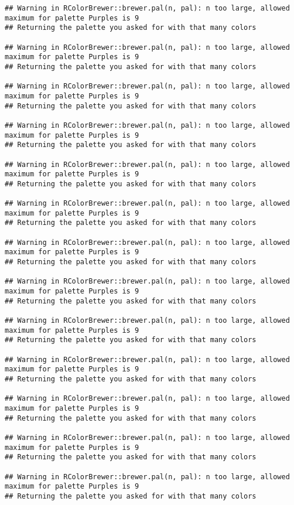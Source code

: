 \documentclass[
]{article}
\begin{document}
\begin{verbatim}
## Warning in RColorBrewer::brewer.pal(n, pal): n too large, allowed maximum for palette Purples is 9
## Returning the palette you asked for with that many colors

## Warning in RColorBrewer::brewer.pal(n, pal): n too large, allowed maximum for palette Purples is 9
## Returning the palette you asked for with that many colors

## Warning in RColorBrewer::brewer.pal(n, pal): n too large, allowed maximum for palette Purples is 9
## Returning the palette you asked for with that many colors

## Warning in RColorBrewer::brewer.pal(n, pal): n too large, allowed maximum for palette Purples is 9
## Returning the palette you asked for with that many colors

## Warning in RColorBrewer::brewer.pal(n, pal): n too large, allowed maximum for palette Purples is 9
## Returning the palette you asked for with that many colors

## Warning in RColorBrewer::brewer.pal(n, pal): n too large, allowed maximum for palette Purples is 9
## Returning the palette you asked for with that many colors

## Warning in RColorBrewer::brewer.pal(n, pal): n too large, allowed maximum for palette Purples is 9
## Returning the palette you asked for with that many colors

## Warning in RColorBrewer::brewer.pal(n, pal): n too large, allowed maximum for palette Purples is 9
## Returning the palette you asked for with that many colors

## Warning in RColorBrewer::brewer.pal(n, pal): n too large, allowed maximum for palette Purples is 9
## Returning the palette you asked for with that many colors

## Warning in RColorBrewer::brewer.pal(n, pal): n too large, allowed maximum for palette Purples is 9
## Returning the palette you asked for with that many colors

## Warning in RColorBrewer::brewer.pal(n, pal): n too large, allowed maximum for palette Purples is 9
## Returning the palette you asked for with that many colors

## Warning in RColorBrewer::brewer.pal(n, pal): n too large, allowed maximum for palette Purples is 9
## Returning the palette you asked for with that many colors

## Warning in RColorBrewer::brewer.pal(n, pal): n too large, allowed maximum for palette Purples is 9
## Returning the palette you asked for with that many colors


\end{verbatim}
\end{document}
